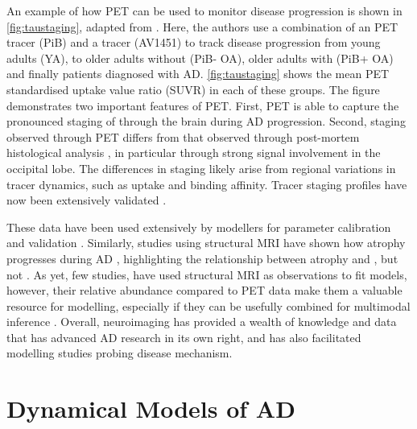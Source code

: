 An example of how \TP PET can be used to monitor disease progression is shown in
\cref{fig:taustaging}, adapted from \cite{SCHOLL2016971}. Here, the authors use
a combination of an \AB PET tracer (PiB) and a \TP tracer (AV1451) to track
disease progression from young adults (YA), to older adults without \AB (PiB-
OA), older adults with \AB (PiB+ OA) and finally patients diagnosed with AD.
\cref{fig:taustaging} shows the mean \TP PET standardised uptake value ratio
(SUVR) in each of these groups. The figure demonstrates two important features
of \TP PET. First, \TP PET is able to capture the pronounced staging of \TP
through the brain during AD progression. Second, \TP staging observed through
PET differs from that observed through post-mortem histological analysis
\cite{braak1991neuropathological}, in particular through strong \TP signal
involvement in the occipital lobe. The differences in staging likely arise from
regional variations in tracer dynamics, such as uptake and binding affinity.
Tracer staging profiles have now been extensively validated \cite{lowe2016,
cho2016vivo, vogel2020spread, biel2021tau, vogel2021four}.

These data have been used extensively by modellers for parameter calibration and
validation \cite{vogel2020spread,schafer2020network,schafer2021bayesian}.
Similarly, studies using structural MRI have shown how atrophy progresses during
AD \cite{whitewell2010}, highlighting the relationship between atrophy and \TP,
but not \AB \cite{Ossenkoppele2016,SCHOLL2016971,lowe2016}. As yet, few studies,
have used structural MRI as observations to fit models, however, their relative
abundance compared to PET data make them a valuable resource for modelling,
especially if they can be usefully combined for multimodal inference
\cite{raj2012network,raj2015network,schafer2022correlating}. Overall,
neuroimaging has provided a wealth of knowledge and data that has advanced AD
research in its own right, and has also facilitated modelling studies probing
disease mechanism.

\section{Dynamical Models of AD}\label{sec:1-uncertainty}

